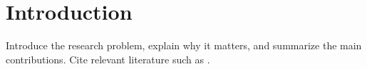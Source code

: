 \section{Introduction}

Introduce the research problem, explain why it matters, and summarize the main contributions. Cite relevant literature such as \cite{sample-reference}.
